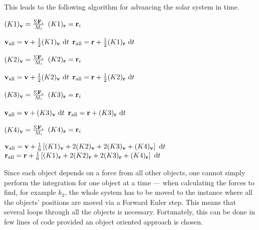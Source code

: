 This leads to the following algorithm for advancing the solar system
in time.
\begin{algorithmic}
            \State $(K1)_{\mathbf{v}} = \frac{\Sigma \mathbf{F}_i}{M_i}$
            \State $(K1)_{\mathbf{r}} = \mathbf{r}_i$
        \EndFor

        \State $\mathbf{v}_{\text{all}} = \mathbf{v} + \frac{1}{2}(K1)_{\mathbf{v}} \ \mathrm{d}t$
        \State $\mathbf{r}_{\text{all}} = \mathbf{r} + \frac{1}{2}(K1)_{\mathbf{r}} \ \mathrm{d}t$

            \State $(K2)_{\mathbf{v}} = \frac{\Sigma \mathbf{F}_i}{M_i}$
            \State $(K2)_{\mathbf{r}} = \mathbf{r}_i$
        \EndFor

        \State $\mathbf{v}_{\text{all}} = \mathbf{v} + \frac{1}{2}(K2)_{\mathbf{v}} \ \mathrm{d}t$
        \State $\mathbf{r}_{\text{all}} = \mathbf{r} + \frac{1}{2}(K2)_{\mathbf{r}} \ \mathrm{d}t$

            \State $(K3)_{\mathbf{v}} = \frac{\Sigma \mathbf{F}_i}{M_i}$
            \State $(K3)_{\mathbf{r}} = \mathbf{r}_i$
        \EndFor

        \State $\mathbf{v}_{\text{all}} = \mathbf{v} + (K3)_{\mathbf{v}} \ \mathrm{d}t$
        \State $\mathbf{r}_{\text{all}} = \mathbf{r} + (K3)_{\mathbf{r}} \ \mathrm{d}t$

            \State $(K4)_{\mathbf{v}} = \frac{\Sigma \mathbf{F}_i}{M_i}$
            \State $(K4)_{\mathbf{r}} = \mathbf{r}_i$
        \EndFor

        \State $\mathbf{v}_{\text{all}} = \mathbf{v} + \frac{1}{6}\left[ (K1)_{\mathbf{v}}
            + 2(K2)_{\mathbf{v}} + 2(K3)_{\mathbf{v}} + (K4)_{\mathbf{v}} \right] \ \mathrm{d}t$
        \State $\mathbf{r}_{\text{all}} = \mathbf{r} + \frac{1}{6}\left[ (K1)_{\mathbf{r}}
            + 2(K2)_{\mathbf{r}} + 2(K3)_{\mathbf{r}} + (K4)_{\mathbf{r}} \right] \ \mathrm{d}t$
    \EndFor
\end{algorithmic}
Since each object depends on a force from all other objects, one
cannot simply perform the integration for one object at a time ---
when calculating the forces to find, for example $k_2$, the whole
system has to be moved to the instance where all the objects'
positions are moved via a Forward Euler step. This means that
several loops through all the objects is necessary. Fortunately,
this can be done in few lines of code provided an object oriented
approach is chosen.
